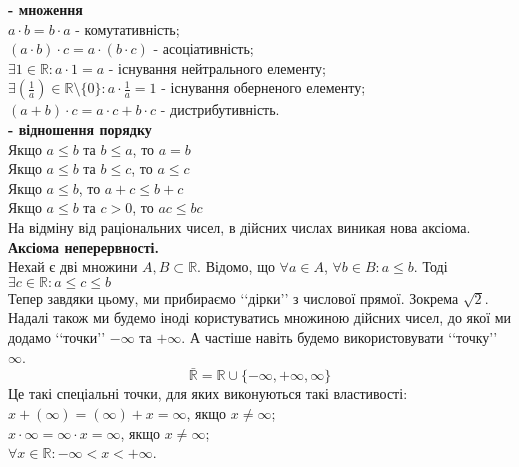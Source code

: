 \documentclass[a4paper, 14pt]{article}
\theoremstyle{theoremdd}
\theoremstyle{theoremdd}
\theoremstyle{theoremdd}
\theoremstyle{theoremdd}
\theoremstyle{theoremdd}
\theoremstyle{theoremdd}
\theoremstyle{theoremdd}
\theoremstyle{theoremdd}
\begin{document}
	\textbf{- множення}\\
	$a \cdot b=b \cdot a$ - комутативність;\\
	$(a \cdot b) \cdot c=a \cdot (b \cdot c)$ - асоціативність;\\
	$\exists 1 \in\mathbb{R}: a \cdot 1=a$ - існування нейтрального елементу;\\
	$\displaystyle \exists \left(\frac{1}{a}\right) \in\mathbb{R} \setminus \{0\}: a \cdot \frac{1}{a}=1$ - існування оберненого елементу;\\
	$(a+b) \cdot c = a \cdot c + b \cdot c$ - дистрибутивність.
	\bigskip \\
	
	\textbf{- відношення порядку}\\
	Якщо $a \leq b$ та $b \leq a$, то $a = b$\\
	Якщо $a \leq b$ та $b \leq c$, то $a \leq c$\\
	Якщо $a \leq b$, то $a+c \leq b+c$\\
	Якщо $a \leq b$ та $c>0$, то $ac \leq bc$
	\bigskip \\	
	
	На відміну від раціональних чисел, в дійсних числах виникая нова аксіома.
	\bigskip \\
	\textbf{Аксіома неперервності. }\\
	Нехай є дві множини $A,B \subset \mathbb{R}$. Відомо, що $\forall a \in A$, $\forall b \in B: a \leq b$. Тоді $\exists c \in \mathbb{R}: a \leq c \leq b$
	\bigskip \\
	Тепер завдяки цьому, ми прибираємо \lq\lq дірки\rq\rq \text{} з числової прямої. Зокрема $\sqrt{2}$.
	\bigskip \\
	Надалі також ми будемо іноді користуватись множиною дійсних чисел, до якої ми додамо \lq\lq точки\rq\rq \text{} $-\infty$ та $+\infty$. А частіше навіть будемо використовувати \lq\lq точку\rq\rq \text{} $\infty$.
	$$\bar{\mathbb{R}} = \mathbb{R} \cup \{-\infty, +\infty, \infty\}$$
	Це такі спеціальні точки, для яких виконуються такі властивості: \\
	$x + (\infty) = (\infty) + x = \infty$, якщо $x \neq \infty$;\\
	$x \cdot \infty = \infty \cdot x = \infty$, якщо $x \neq \infty$;\\
	$\forall x \in \mathbb{R}: -\infty < x < +\infty$.
\end{document}

